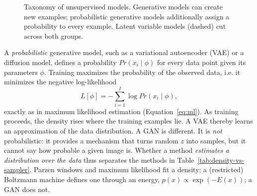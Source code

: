 \begin{figure}[ht]
  \centering
  \caption{Taxonomy of unsupervised models. Generative models can create new
  examples; probabilistic generative models additionally assign a probability
  to every example. Latent variable models (dashed) cut across both groups.}
  \label{fig:gen-taxonomy}
\end{figure}

\noindent
A \emph{probabilistic} generative model, such as a variational autoencoder
(VAE) or a diffusion model, defines a probability $Pr(x_i\mid\phi)$ for every
data point given its parameters $\phi$. Training maximizes the probability of
the observed data, i.e. it minimizes the negative log-likelihood
\begin{equation}
  L[\phi] = -\sum_{i=1}^{I}\log Pr(x_i\mid\phi),
  \label{eq:gen-nll}
\end{equation}
\noindent
exactly as in maximum likelihood estimation (Equation~\ref{eq:ml}). As training
proceeds, the density rises where the training examples lie. A VAE thereby
learns an approximation of the data distribution. A GAN is different. It is
\emph{not} probabilistic: it provides a mechanism that turns random $z$ into
samples, but it cannot say how probable a given image is. Whether a method
\emph{estimates a distribution over the data} thus separates the methods in
Table~\ref{tab:density-vs-sampler}. Parzen windows and maximum likelihood fit a
density; a (restricted) Boltzmann machine defines one through an energy,
$p(x)\propto\exp(-E(x))$; a GAN does not.


